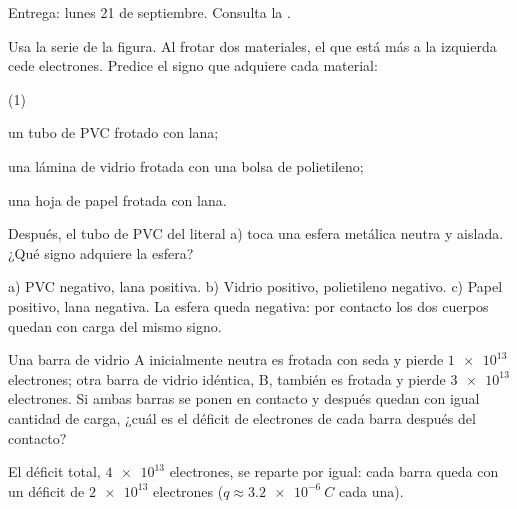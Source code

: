 \documentclass[11pt]{article}
\begin{document}
\encabezado

\begin{instrucciones}
Entrega: lunes 21 de septiembre. Consulta la .
\end{instrucciones}

\begin{center}
\end{center}

\begin{preguntas}

\pregunta Usa la serie de la figura. Al frotar dos materiales, el que está más a la izquierda
cede electrones. Predice el signo que adquiere cada material:
\begin{opciones*}(1)
  \item un tubo de PVC frotado con lana;
  \item una lámina de vidrio frotada con una bolsa de polietileno;
  \item una hoja de papel frotada con lana.
\end{opciones*}
Después, el tubo de PVC del literal a) toca una esfera metálica neutra y aislada. ¿Qué signo
adquiere la esfera?
\espacio{3cm}
\begin{solucion}
a) PVC negativo, lana positiva. b) Vidrio positivo, polietileno negativo. c) Papel positivo,
lana negativa. La esfera queda negativa: por contacto los dos cuerpos quedan con carga del
mismo signo.
\end{solucion}

\pregunta Una barra de vidrio A inicialmente neutra es frotada con seda y pierde $\num{1e13}$
electrones; otra barra de vidrio idéntica, B, también es frotada y pierde $\num{3e13}$
electrones. Si ambas barras se ponen en contacto y después quedan con igual cantidad de carga,
¿cuál es el déficit de electrones de cada barra después del contacto?
\espacio{3.5cm}
\begin{solucion}
El déficit total, $\num{4e13}$ electrones, se reparte por igual: cada barra queda con un
déficit de $\num{2e13}$ electrones ($q \approx \qty{+3,2e-6}{C}$ cada una).
\end{solucion}

\end{preguntas}
\end{document}
